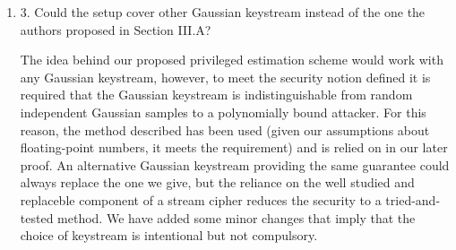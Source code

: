 \documentclass[a4paper]{scrartcl}
\newenvironment{rebuttal}{\begin{enumerate}[label={\color{grey}\thesection.\arabic{enumi}},leftmargin=0pt,ref=\thesection.\arabic{enumi}]}{\end{enumerate}}
\newcommand{\reviewtext}[1]{{\color{nblue} #1}}
\begin{document}
\begin{rebuttal}
\item \reviewtext{3. Could the setup cover other Gaussian keystream instead of the one the authors proposed in Section III.A?}

The idea behind our proposed privileged estimation scheme would work with any Gaussian keystream, however, to meet the security notion defined it is required that the Gaussian keystream is indistinguishable from random independent Gaussian samples to a polynomially bound attacker. For this reason, the method described has been used (given our assumptions about floating-point numbers, it meets the requirement) and is relied on in our later proof. An alternative Gaussian keystream providing the same guarantee could always replace the one we give, but the reliance on the well studied and replaceble component of a stream cipher reduces the security to a tried-and-tested method. We have added some minor changes that imply that the choice of keystream is intentional but not compulsory.

\end{rebuttal}


\end{document}
